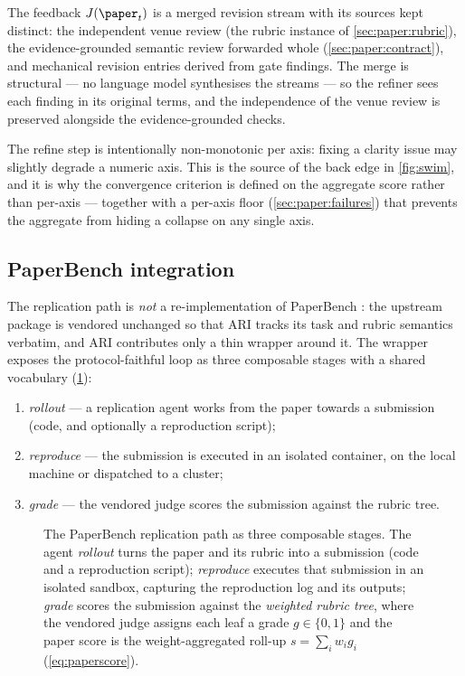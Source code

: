 The feedback $J(\paper_t)$ is a merged revision stream with its
sources kept distinct: the independent venue review (the rubric
instance of \cref{sec:paper:rubric}), the evidence-grounded semantic
review forwarded whole (\cref{sec:paper:contract}), and mechanical
revision entries derived from gate findings. The merge is structural
--- no language model synthesises the streams --- so the refiner sees
each finding in its original terms, and the independence of the venue
review is preserved alongside the evidence-grounded checks.

The refine step is intentionally non-monotonic per axis: fixing a
clarity issue may slightly degrade a numeric axis. This is the source
of the back edge in \cref{fig:swim}, and it is why the convergence
criterion is defined on the aggregate score rather than per-axis ---
together with a per-axis floor (\cref{sec:paper:failures}) that
prevents the aggregate from hiding a collapse on any single axis.

\subsection{PaperBench integration}\label{sec:paper:paperbench}

The replication path is \emph{not} a re-implementation of PaperBench
\cite{starace2025paperbench}: the upstream package is vendored
unchanged so that ARI tracks its task and rubric semantics verbatim,
and ARI contributes only a thin wrapper around it. The wrapper exposes
the protocol-faithful loop as three composable stages with a shared
vocabulary (\cref{fig:pb-stages}):

\begin{enumerate}
  \item \emph{rollout} --- a replication agent works from the paper
        towards a submission (code, and optionally a reproduction
        script);
  \item \emph{reproduce} --- the submission is executed in an isolated
        container, on the local machine or dispatched to a cluster;
  \item \emph{grade} --- the vendored judge scores the submission
        against the rubric tree.
\end{enumerate}

\begin{figure}[t]
  \centering
  \resizebox{\textwidth}{!}{}
  \caption{The PaperBench replication path as three composable stages.
           The agent \emph{rollout} turns the paper and its rubric into a
           submission (code and a reproduction script); \emph{reproduce}
           executes that submission in an isolated sandbox, capturing the
           reproduction log and its outputs; \emph{grade} scores the
           submission against the \emph{weighted rubric tree}, where the
           vendored judge assigns each leaf a grade $g\in\{0,1\}$ and the
           paper score is the weight-aggregated roll-up
           $s=\sum_i w_i g_i$ (\cref{eq:paperscore}).}
  \label{fig:pb-stages}
\end{figure}

